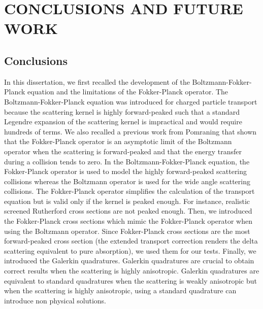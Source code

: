 \chapter{\uppercase{Conclusions and future work}}\label{conclusion_chapter}
\section{Conclusions}
In this dissertation, we first recalled the development of the
Boltzmann-Fokker-Planck equation and the limitations of the Fokker-Planck operator.
The Boltzmann-Fokker-Planck equation was introduced for charged particle transport
because the scattering kernel is highly forward-peaked such that a standard Legendre
expansion of the scattering kernel is impractical and would require hundreds 
of terms. We also recalled a previous work from Pomraning that shown that the 
Fokker-Planck 
operator is an asymptotic limit of the Boltzmann 
operator when the scattering is forward-peaked and that the energy transfer 
during a collision tends to zero. In the Boltzmann-Fokker-Planck equation, the 
Fokker-Planck operator is used to model 
the highly forward-peaked scattering collisions whereas the Boltzmann operator 
is used for the wide angle scattering collisions. The Fokker-Planck operator 
simplifies the calculation of the transport equation but is valid only if 
the kernel is peaked enough. For instance, realistic screened Rutherford 
cross sections are not peaked enough. Then, we introduced the Fokker-Planck 
cross sections which mimic the Fokker-Planck operator when using the Boltzmann
operator. Since Fokker-Planck cross sections are the most forward-peaked cross
section (the extended transport correction renders the delta scattering equivalent 
to pure absorption), we used them for our tests. Finally, we introduced the Galerkin 
quadratures. Galerkin quadratures are crucial to obtain correct results when 
the scattering is highly anisotropic. Galerkin quadratures are equivalent
to standard quadratures when the scattering is weakly anisotropic but when the
scattering is highly anisotropic, using a standard quadrature can introduce
non physical solutions.

